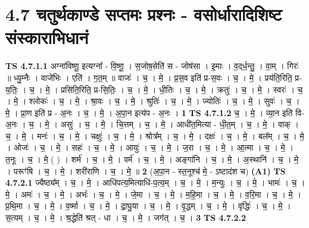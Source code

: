 \documentclass[17pt]{extarticle}
\begin{document}
\section*{ 4.7     चतुर्थकाण्डे सप्तमः प्रश्नः - वसोर्धारादिशिष्ट संस्काराभिधानं }
                                \textbf{ TS 4.7.1.1} \newline
                  अग्ना॑विष्णू॒ इत्यग्ना᳚ - वि॒ष्णू॒ । स॒जोष॒सेति॑ स - जोष॑सा । इ॒माः । व॒द्‌र्ध॒न्तु॒ । वा॒म् । गिरः॑ ॥ ध्यु॒म्नैः । वाजे॑भिः । एति॑ । ग॒त॒म् ॥ वाजः॑ । च॒ । मे॒ । प्र॒स॒व इति॑ प्र-स॒वः । च॒ । मे॒ । प्रय॑ति॒रिति॒ प्र-य॒तिः॒ । च॒ । मे॒ । प्रसि॑ति॒रिति॒ प्र-सि॒तिः॒ । च॒ । मे॒ । धी॒तिः । च॒ । मे॒ । क्रतुः॑ । च॒ । मे॒ । स्वरः॑ । च॒ । मे॒ । श्लोकः॑ । च॒ । मे॒ । श्रा॒वः । च॒ । मे॒ । श्रुतिः॑ । च॒ । मे॒ । ज्योतिः॑ । च॒ । मे॒ । सुवः॑ । च॒ । मे॒ । प्रा॒ण इति॑ प्र - अ॒नः । च॒ । मे॒ । अ॒पा॒न इत्य॑प - अ॒नः । \textbf{  1} \newline
                  \newline
                                \textbf{ TS 4.7.1.2} \newline
                  च॒ । मे॒ । व्या॒न इति॑ वि-अ॒नः । च॒ । मे॒ । असुः॑ । च॒ । मे॒ । चि॒त्तम् । च॒ । मे॒ । आधी॑त॒मित्या - धी॒त॒म् । च॒ । मे॒ । वाक् । च॒ । मे॒ । मनः॑ । च॒ । मे॒ । चक्षुः॑ । च॒ । मे॒ । श्रोत्र᳚म् । च॒ । मे॒ । दक्षः॑ । च॒ । मे॒ । बल᳚म् । च॒ । मे॒ । ओजः॑ । च॒ । मे॒ । सहः॑ । च॒ । मे॒ । आयुः॑ । च॒ । मे॒ । ज॒रा । च॒ । मे॒ । आ॒त्मा । च॒ । मे॒ । त॒नूः । च॒ । मे॒ ( ) । शर्म॑ । च॒ । मे॒ । वर्म॑ । च॒ । मे॒ । अङ्गा॑नि । च॒ । मे॒ । अ॒स्थानि॑ । च॒ । मे॒ । परूꣳ॑षि । च॒ । मे॒ । शरी॑राणि । च॒ । मे॒ ॥ \textbf{  2} \newline
                  \newline
                      (अ॒पा॒न - स्त॒नूश्च॑ मे॒ - ऽष्टाद॑श च)  \textbf{(A1)} \newline \newline
                                \textbf{ TS 4.7.2.1} \newline
                  ज्यैष्ठ्य᳚म् । च॒ । मे॒ । आधि॑पत्य॒मित्याधि॑-प॒त्य॒म् । च॒ । मे॒ । म॒न्युः । च॒ । मे॒ । भामः॑ । च॒ । मे॒ । अमः॑ । च॒ । मे॒ । अभंः॑ । च॒ । मे॒ । जे॒मा । च॒ । मे॒ । म॒हि॒मा । च॒ । मे॒ । व॒रि॒मा । च॒ । मे॒ । प्र॒थि॒मा । च॒ । मे॒ । व॒र्ष्मा । च॒ । मे॒ । द्रा॒घु॒या । च॒ । मे॒ । वृ॒द्धम् । च॒ । मे॒ । वृद्धिः॑ । च॒ । मे॒ । स॒त्यम् । च॒ । मे॒ । श्र॒द्धेति॑ श्रत् - धा । च॒ । मे॒ । जग॑त् । च॒ । \textbf{  3} \newline
                  \newline
                                \textbf{ TS 4.7.2.2} \newline
\end{document}
